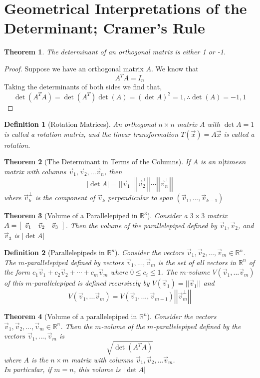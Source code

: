 \documentclass[10pt]{report}
\newtheorem{thm2}{Theorem}[section]
\newtheorem{def2}{Definition}[section]
\begin{document}
\section{Geometrical Interpretations of the Determinant; Cramer's Rule}
\begin{thm2}
The determinant of an orthogonal matrix is either 1 or -1.
\end{thm2}
\begin{proof}
Suppose we have an orthogonal matrix $A$. We know that 
$$A^TA=I_n$$
Taking the determinants of both sides we find that, 
$$\det(A^TA) = \det(A^T)\det(A) = (\det A)^2 = 1, \therefore \det(A) = -1,1$$
\end{proof}
\begin{def2}[Rotation Matrices]
An orthogonal $n\times n$ matrix $A$ with $\det A=1$ is called a rotation matrix, and the linear transformation $T(\vec{x})=A\vec{x}$ is called a rotation.
\end{def2}
\begin{thm2}[The Determinant in Terms of the Columns]
If $A$ is an $n]times n$ matrix with columns $\vec{v}_1, \vec{v}_2,...\vec{v}_n$, then
$$|\det A|=||\vec{v}_1||\left|\left| \vec{v}_2^\perp \right|\right|\cdots \left|\left| \vec{v}_n^\perp \right|\right|$$
where $\vec{v}_k^\perp$ is the component of $\vec{v}_k$ perpendicular to span $(\vec{v}_1,...,\vec{v}_{k-1})$
\end{thm2}
\begin{thm2}[Volume of a Parallelepiped in $\mathbb{R}^3$]
Consider a $3\times 3$ matrix $A=\left[\begin{array}{c c c}
\vec{v}_1 & \vec{v}_2 & \vec{v}_3
\end{array}\right]$. Then the volume of the parallelepiped defined by $\vec{v}_1,\vec{v}_2$, and $\vec{v}_3$ is $|\det A|$
\end{thm2}
\begin{def2}[Parallelepipeds in $\mathbb{R}^n$]
Consider the vectors $\vec{v}_1,\vec{v}_2, ..., \vec{v}_m \in \mathbb{R}^n$. The $m$-parallelepiped defined by vectors $\vec{v}_1,...,\vec{v}_m$ is the set of all vectors in $\mathbb{R}^n$ of the form $c_1\vec{v}_1 + c_2\vec{v}_2 + \cdots + c_m\vec{v}_m$ where $0\leq c_i\leq 1$. The $m$-volume $V(\vec{v}_1,...\vec{v}_m)$ of this $m$-parallelepiped is defined recursively by $V(\vec{v}_1)=||\vec{v}_1||$ and
$$V(\vec{v}_1,...\vec{v}_m)= V(\vec{v}_1,...,\vec{v}_{m-1}) \left|\left| \vec{v}_m^\perp \right|\right|$$
\end{def2}
\begin{thm2}[Volume of a parallelepiped in $\mathbb{R}^n$]
Consider the vectors $\vec{v}_1, \vec{v}_2, ..., \vec{v}_m \in \mathbb{R}^n$. Then the $m$-volume of the $m$-parallelepiped defined by the vectors $\vec{v}_1, ..., \vec{v}_m$ is
$$\sqrt{\det(A^TA)}$$
where $A$ is the $n\times m$ matrix with columns $\vec{v}_1, \vec{v}_2, ...\vec{v}_m$.\\
In particular, if $m=n$, this volume is $|\det A|$ 
\end{thm2}
\end{document}
